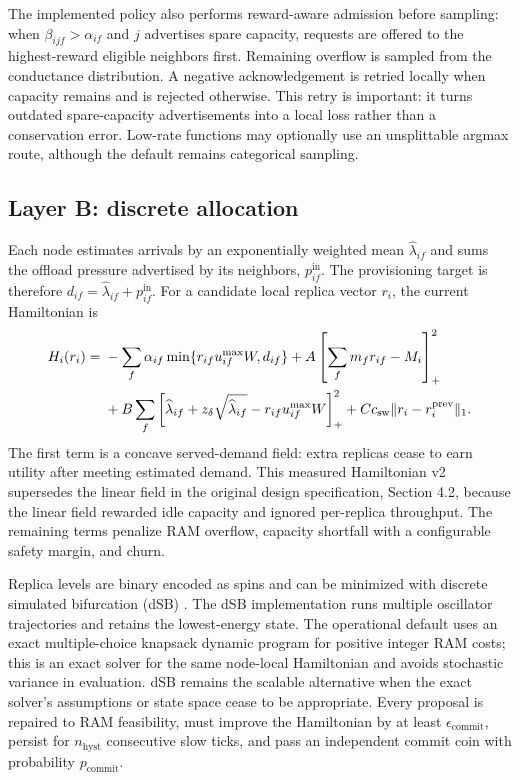 The implemented policy also performs reward-aware admission before sampling:
when $\beta_{ijf}>\alpha_{if}$ and $j$ advertises spare capacity, requests are
offered to the highest-reward eligible neighbors first.  Remaining overflow is
sampled from the conductance distribution.  A negative acknowledgement is
retried locally when capacity remains and is rejected otherwise.  This retry
is important: it turns outdated spare-capacity advertisements into a local
loss rather than a conservation error.  Low-rate functions may optionally use
an unsplittable argmax route, although the default remains categorical
sampling.

\subsection{Layer B: discrete allocation}
Each node estimates arrivals by an exponentially weighted mean
$\widehat{\lambda}_{if}$ and sums the offload pressure advertised by its
neighbors, $p_{if}^{\mathrm{in}}$.  The provisioning target is therefore
$d_{if}=\widehat{\lambda}_{if}+p_{if}^{\mathrm{in}}$.  For a candidate local
replica vector $r_i$, the current Hamiltonian is
\begin{align}
 H_i(r_i)={}&-\sum_f \alpha_{if}
 \min\{r_{if}u_{if}^{\max}W,d_{if}\}
 +A\left[\sum_fm_fr_{if}-M_i\right]_+^2 \notag\\
 &+B\sum_f\left[\widehat{\lambda}_{if}
 +z_\delta\sqrt{\widehat{\lambda}_{if}}
 -r_{if}u_{if}^{\max}W\right]_+^2
 +C c_{\mathrm{sw}}\lVert r_i-r_i^{\mathrm{prev}}\rVert_1 .
 \label{eq:plasma-hamiltonian}
\end{align}
The first term is a concave served-demand field: extra replicas cease to earn
utility after meeting estimated demand.  This measured Hamiltonian v2
supersedes the linear field in the original design specification, Section
4.2, because the linear field rewarded idle capacity and ignored per-replica
throughput.  The remaining terms penalize RAM overflow, capacity shortfall
with a configurable safety margin, and churn.

Replica levels are binary encoded as spins and can be minimized with discrete
simulated bifurcation (dSB) \citep{goto2021high}.  The dSB implementation runs
multiple oscillator trajectories and retains the lowest-energy state.  The
operational default uses an exact multiple-choice knapsack dynamic program
for positive integer RAM costs; this is an exact solver for the same node-local
Hamiltonian and avoids stochastic variance in evaluation.  dSB remains the
scalable alternative when the exact solver's assumptions or state space cease
to be appropriate.  Every proposal is repaired to RAM feasibility, must
improve the Hamiltonian by at least $\epsilon_{\mathrm{commit}}$, persist for
$n_{\mathrm{hyst}}$ consecutive slow ticks, and pass an independent commit
coin with probability $p_{\mathrm{commit}}$.

